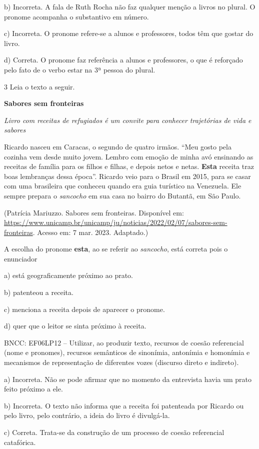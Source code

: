 b) Incorreta. A fala de Ruth Rocha não faz qualquer menção a livros no
plural. O pronome acompanha o substantivo em número.

c) Incorreta. O pronome refere-se a alunos e professores, todos têm que
gostar do livro.

d) Correta. O pronome faz referência a alunos e professores, o que é
reforçado pelo fato de o verbo estar na 3ª pessoa do plural.

\num{3} Leia o texto a seguir.

\textbf{Sabores sem fronteiras}

\emph{Livro com receitas de refugiados é um convite para conhecer
trajetórias de vida e sabores}

Ricardo nasceu em Caracas, o segundo de quatro irmãos. ``Meu gosto pela
cozinha vem desde muito jovem. Lembro com emoção de minha avó ensinando
as receitas de família para os filhos e filhas, e depois netos e netas.
\textbf{Esta} receita traz boas lembranças dessa época''. Ricardo veio
para o Brasil em 2015, para se casar com uma brasileira que conheceu
quando era guia turístico na Venezuela. Ele sempre prepara o
\emph{sancocho} em sua casa no bairro do Butantã, em São Paulo.

(Patrícia Mariuzzo. Sabores sem fronteiras. Disponível em:
\url{https://www.unicamp.br/unicamp/ju/noticias/2022/02/07/sabores-sem-fronteiras}.
Acesso em: 7 mar. 2023. Adaptado.)

A escolha do pronome \textbf{esta}, ao se referir ao \emph{sancocho},
está correta pois o enunciador

a) está geograficamente próximo ao prato.

b) patenteou a receita.

c) menciona a receita depois de aparecer o pronome.

d) quer que o leitor se sinta próximo à receita.

BNCC: EF06LP12 -- Utilizar, ao produzir texto, recursos de coesão
referencial (nome e pronomes), recursos semânticos de sinonímia,
antonímia e homonímia e mecanismos de representação de diferentes vozes
(discurso direto e indireto).

a) Incorreta. Não se pode afirmar que no momento da entrevista havia um
prato feito próximo a ele.

b) Incorreta. O texto não informa que a receita foi patenteada por
Ricardo ou pelo livro, pelo contrário, a ideia do livro é divulgá-la.

c) Correta. Trata-se da construção de um processo de coesão referencial
catafórica.

